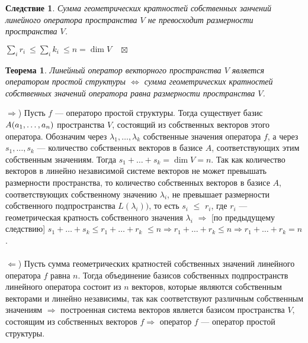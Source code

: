 \newtheorem*{cor11_9_2}{Следствие}\begin{cor11_9_2}Сумма геометрических кратностей собственных занчений линейного оператора пространства $V$ не превосходит размерности пространства $V$.
\end{cor11_9_2}\begin{Proof}
	$ \sum\limits_i r_i \ \leqslant \sum\limits_i k_i \ \leqslant n = \dim  V \quad \boxtimes$
\end{Proof}
\newtheorem*{th11_9_1}{Теорема}\begin{th11_9_1}Линейный оператор векторного пространства $V$ является оператором простой структуры $\Longleftrightarrow$
	сумма геометрических кратностей собственных значений оператора равна размерности пространства $V$.
\end{th11_9_1}\begin{Proof}
	$\Rightarrow$) Пусть $f$ --- операторо простой структуры. Тогда существует базис $A(a_1,\dots,a_n)$ пространства $V$, состоящий из собственных векторов этого оператора. Обозначим через $\lambda_1, \dots, \lambda_k$ собственные значения оператора $f$, а через $s_1, \dots, s_k$ --- количество собственных векторов в базисе $A$, соответствующих этим собственным значениям. Тогда $s_1 + \ldots + s_k = \dim  V = n$. Так как количество векторов в линейно независимой системе векторов не может превышать размерности пространства, то количество собственных векторов в базисе $A$, соответствующих собственному значению $\lambda_i$, не превышает размерности собственного подпространства $L(\lambda_i))$, то есть $s_i$ $\leqslant$ $r_i$, где $r_i$ --- геометрическая кратность собственного значения $\lambda_i$ $\Rightarrow$ [по предыдущему следствию] $s_1 + \ldots + s_k \leqslant r_1 + \ldots + r_k$ $\leqslant n \Rightarrow r_1 + \ldots + r_k \leqslant n\Rightarrow r_1 + \ldots + r_k = n$.\\\\
	$ \Leftarrow$) Пусть сумма геометрических кратностей собственных значений линейного оператора $f$ равна $n$. Тогда объединение базисов собственных подпространств линейного оператора состоит из $n$ векторов, которые являются собственным векторами и линейно независимы, так как соответствуют различным собственным значениям $\Rightarrow$ построенная система векторов является базисом пространства $V$, состоящим из собственных векторов $f \Rightarrow$ оператор $f$ --- оператор простой структуры.
\end{Proof}











